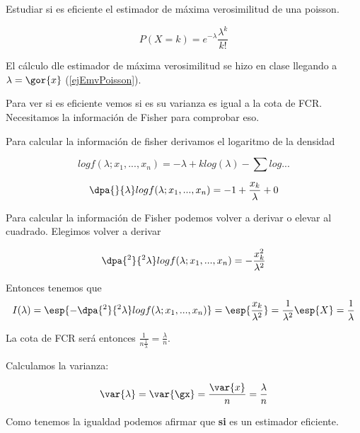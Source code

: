 \begin{problem}[4]
Estudiar si es eficiente el estimador de máxima verosimilitud de una poisson.
\solution


\[ P(X = k) = e^{-\lambda} \frac{\lambda^{k}}{k!} \]

El cálculo dle estimador de máxima verosimilitud se hizo en clase llegando a $\lambda = \gor{x}$ (\ref{ejEmvPoisson}).

Para ver si es eficiente vemos si es su varianza es igual a la cota de FCR. Necesitamos la información de Fisher para comprobar eso.

Para calcular la información de fisher derivamos el logaritmo de la densidad

\[log f(\lambda;x_1,...,x_n) = -\lambda + k log(\lambda) - \sum log...\]

\[\dpa{}{\lambda} log f (\lambda;x_1,...,x_n) = - 1 + \frac{x_k}{\lambda} + 0\]

Para calcular la información de Fisher podemos volver a derivar o elevar al cuadrado. Elegimos volver a derivar

\[\dpa{^2}{^2\lambda} log f (\lambda;x_1,...,x_n) = -\frac{x_k^2}{\lambda^2}\]

Entonces tenemos que \[I(\lambda) = \esp{-\dpa{^2}{^2\lambda} log f (\lambda;x_1,...,x_n)} = \esp{\frac{x_k}{\lambda^2}} = \frac{1}{\lambda^2}\esp{X} = \frac{1}{\lambda}\]

La cota de FCR será entonces $\displaystyle\frac{1}{n\frac{1}{\lambda}} = \frac{\lambda}{n}$.

Calculamos la varianza:

\[\var{\lambda} = \var{\gx} = \frac{\var{x}}{n} = \frac{\lambda}{n}\]

Como tenemos la igualdad podemos afirmar que \textbf{si} es un estimador eficiente.
\end{problem}

